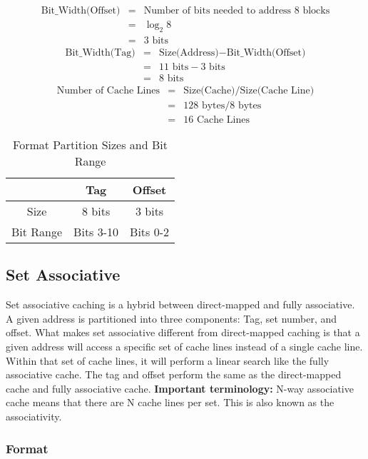 \documentclass[11pt]{article}
\begin{document}
\begin{eqnarray*}
	\text{Bit\_Width(Offset)} &=& \text{Number of bits needed to address 8 blocks}\\
	&=& \log_2 8\\
	&=& 3 \text{ bits}
\end{eqnarray*}
\begin{eqnarray*}
	\text{Bit\_Width(Tag)} &=& \text{Size(Address)} - \text{Bit\_Width(Offset)}\\
	&=& 11 \text{ bits} - 3 \text{ bits}\\
	&=& 8 \text{ bits}
\end{eqnarray*}
\begin{eqnarray*}
	\text{Number of Cache Lines} &=& \text{Size(Cache)} / \text{Size(Cache Line)}\\
	&=& 128 \text{ bytes} / 8 \text{ bytes}\\
	&=& 16 \text{ Cache Lines}
\end{eqnarray*}

\begin{table}[H]
	\centering
	\caption*{Format Partition Sizes and Bit Range}
	\begin{tabular}{| c | c | c |}
		\hline
		&	Tag		&	Offset\\
		\hline
		Size		&	8 bits		&	3 bits\\
		\hline
		Bit Range	&	Bits 3-10	&	Bits 0-2\\
		\hline
	\end{tabular}
\end{table}

\subsection{Set Associative}

Set associative caching is a hybrid between direct-mapped and fully associative. A given address is partitioned into three components: Tag, set number, and offset. What makes set associative different from direct-mapped caching is that a given address will access a specific set of cache lines instead of a single cache line. Within that set of cache lines, it will perform a linear search like the fully associative cache. The tag and offset perform the same as the direct-mapped cache and fully associative cache. \textbf{Important terminology:} N-way associative cache means that there are N cache lines per set. This is also known as the associativity.

\subsubsection{Format}
\end{document}
